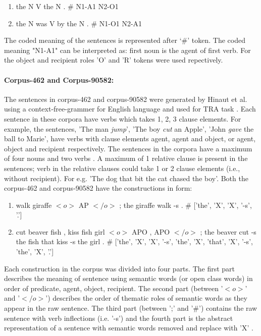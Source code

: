 \begin{enumerate}[noitemsep]
\item the N V the N . \# N1-A1   N2-O1
\item the N was V by the N . \# N1-O1  N2-A1
\end{enumerate}

The coded meaning of the sentences is represented after `$\#$' token. The coded meaning "N1-A1" can be interpreted as: first noun is the agent of first verb. For the object and recipient roles 'O' and 'R' tokens were used repectively.

\paragraph{Corpus-462 and Corpus-90582:} The sentences in corpus-462 and corpus-90582 were generated by Hinaut et al. using a context-free-grammer for English language and used for TRA task \cite{xavier:2013:RT}. Each sentence in these corpora have verbs which takes 1, 2, 3 clause elements. For example, the sentences, 'The man \textit{jump}', 'The boy \textit{cut} an Apple', 'John \textit{gave} the ball to Marie', have verbs with clause elements agent, agent and object, or agent, object and recipient respectively. The sentences in the corpora have a maximum of four nouns and two verbs \cite{xavier:2013:RT}. A maximum of 1 relative clause is present in the sentences; verb in the relative clauses could take 1 or 2 clause elements (i.e., without recipient). For e.g. 'The dog that bit the cat chased the boy'. Both the corpus-462 and corpus-90582 have the constructions in form:

\begin{enumerate}[noitemsep]
\item walk giraffe $<\!o\!>$ AP $<\!/o\!>$ ; the giraffe walk -s . \# ['the', 'X', 'X', '-s', '.']
\item cut beaver fish , kiss fish girl $<\!o\!>$ APO , APO $<\!/o\!>$ ; the beaver cut -s the fish that kiss -s the girl . \# ['the', 'X', 'X', '-s', 'the', 'X', 'that', 'X', '-s', 'the', 'X', '.']
\end{enumerate}

Each construction in the corpus was divided into four parts. The first part describes the meaning of sentence using semantic words (or open class words) in order of predicate, agent, object, recipient. The second part (between '$<\!o\!>$' and '$<\!/o\!>$') describes the order of thematic roles of semantic words as they appear in the raw sentence. The third part (between ';' and '\#') contains the raw sentence with verb inflections (i.e. '-s') and the fourth part is the abstract representation of a sentence with semantic words removed and replace with 'X' \cite{xavier:2013:RT}.

